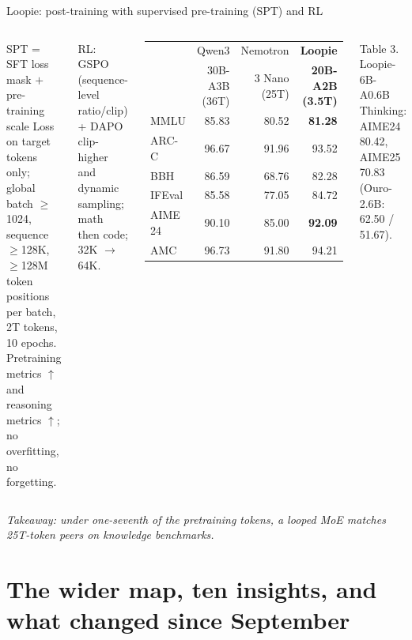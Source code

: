 \documentclass[aspectratio=169,10pt]{beamer}
\newcommand{\pos}[1]{\textcolor{positive}{#1}}
\begin{document}
\begin{frame}{Loopie: post-training with supervised pre-training (SPT) and RL}
  \begin{columns}[T]
      \begin{block}{SPT = SFT loss mask $+$ pre-training scale}
        Loss on target tokens only; global batch $\ge$1024, sequence $\ge$128K, $\ge$128M token positions per batch, 2T tokens, 10 epochs.\\
        \pos{Pretraining metrics $\uparrow$} and \pos{reasoning metrics $\uparrow$}; no overfitting, no forgetting.
      \end{block}
      RL: GSPO (sequence-level ratio/clip) + DAPO clip-higher and dynamic sampling; math then code; 32K $\to$ 64K.
      \vspace{4pt}
      \begin{center}
      \footnotesize
      \begin{tabular}{@{}lrrr@{}}
        \toprule
         & Qwen3 & Nemotron & \textbf{Loopie} \\
         & 30B-A3B (36T) & 3 Nano (25T) & \textbf{20B-A2B (3.5T)} \\
        \midrule
        MMLU & 85.83 & 80.52 & \textbf{81.28} \\
        ARC-C & 96.67 & 91.96 & 93.52 \\
        BBH & 86.59 & 68.76 & 82.28 \\
        IFEval & 85.58 & 77.05 & 84.72 \\
        AIME 24 & 90.10 & 85.00 & \textbf{92.09} \\
        AMC & 96.73 & 91.80 & 94.21 \\
        \bottomrule
      \end{tabular}
      \end{center}
      {\small Table 3. Loopie-6B-A0.6B Thinking: AIME24 80.42, AIME25 70.83 (Ouro-2.6B: 62.50 / 51.67).}
  \end{columns}
  \vspace{4pt}
  \textit{Takeaway: under one-seventh of the pretraining tokens, a looped MoE matches 25T-token peers on knowledge benchmarks.}
\end{frame}

\section{The wider map, ten insights, and what changed since September}
\end{document}

